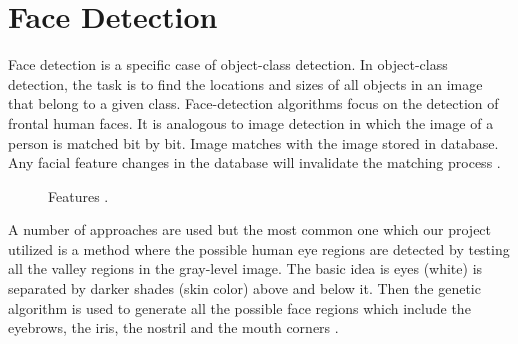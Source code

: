\documentclass[9pt,twocolumn,twoside]{../../styles/osajnl}
\begin{document}
\section{Face Detection}

Face detection is a specific case of object-class detection. In
object-class detection, the task is to find the locations and sizes of
all objects in an image that belong to a given class. Face-detection
algorithms focus on the detection of frontal human faces. It is
analogous to image detection in which the image of a person is matched
bit by bit. Image matches with the image stored in database. Any
facial feature changes in the database will invalidate the matching
process \cite{fd-using-haar}.

\begin{figure}[htbp]
\centering
{}
\caption{Features \cite{fd-using-haar}.}
\label{fig:false-color}
\end{figure}

A number of approaches are used but the most common one which our
project utilized is a method where the possible human eye regions are
detected by testing all the valley regions in the gray-level
image. The basic idea is eyes (white) is separated by darker shades
(skin color) above and below it. Then the genetic algorithm is used to
generate all the possible face regions which include the eyebrows, the
iris, the nostril and the mouth corners \cite{fd-using-haar}.
\end{document}
